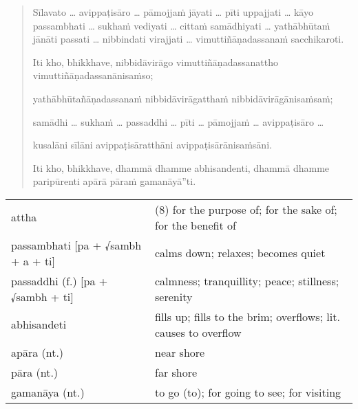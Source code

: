 \documentclass[11pt,oneside]{memoir}
\begin{document}
\begin{quote}
Sīlavato \ldots{}
avippaṭisāro \ldots{}
pāmojjaṁ jāyati \ldots{}
pīti uppajjati \ldots{}
kāyo passambhati \ldots{}
sukhaṁ vediyati \ldots{}
cittaṁ samādhiyati \ldots{}
yathābhūtaṁ jānāti passati \ldots{}
nibbindati virajjati \ldots{}
vimuttiñāṇadassanaṁ sacchikaroti.

Iti kho, bhikkhave, nibbidāvirāgo vimuttiñāṇadassanattho vimuttiñāṇadassanānisaṁso;

yathābhūtañāṇadassanaṁ nibbidāvirāgatthaṁ nibbidāvirāgānisaṁsaṁ;

samādhi \ldots{} sukhaṁ \ldots{} passaddhi \ldots{} pīti \ldots{} pāmojjaṁ \ldots{} avippaṭisāro \ldots{}

kusalāni sīlāni avippaṭisāratthāni avippaṭisārānisaṁsāni.

Iti kho, bhikkhave, dhammā dhamme abhisandenti, dhammā dhamme paripūrenti apārā pāraṁ gamanāyā”ti.
\end{quote}

\begin{longtable}{L{\colOne} L{\colTwo}}
attha & (8) for the purpose of; for the sake of; for the benefit of\\[0pt]
passambhati [pa + √sambh + a + ti] & calms down; relaxes; becomes quiet\\[0pt]
passaddhi (f.) [pa + √sambh + ti] & calmness; tranquillity; peace; stillness; serenity\\[0pt]
abhisandeti & fills up; fills to the brim; overflows; lit. causes to overflow\\[0pt]
apāra (nt.) & near shore\\[0pt]
pāra (nt.) & far shore\\[0pt]
gamanāya (nt.) & to go (to); for going to see; for visiting\\[0pt]
\end{longtable}

\clearpage
\end{document}
